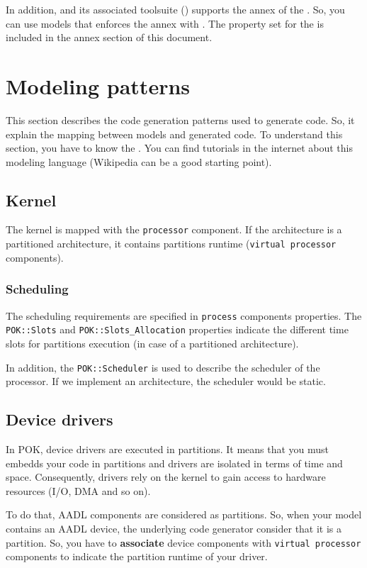    In addition, \pok and its associated \aadl toolsuite (\ocarina) supports the
   \arinc annex of the \aadl. So, you can use models that enforces the \arinc
   annex with \pok. The \arinc property set for the \aadl is included in the
   annex section of this document.

   \section{Modeling patterns}
   This section describes the code generation patterns used to generate code.
   So, it explain the mapping between \aadl models and generated code. To
   understand this section, you have to know the \aadl. You can find tutorials
   in the internet about this modeling language (Wikipedia can be a good
   starting point).

      \subsection{Kernel}
      The kernel is mapped with the \aadl \texttt{processor} component. If the
      architecture is a partitioned architecture, it contains partitions runtime
      (\aadl \texttt{virtual processor} components).

         \subsubsection{Scheduling}
         The scheduling requirements are specified in \texttt{process}
         components properties. The \texttt{POK::Slots} and
         \texttt{POK::Slots\_Allocation} properties indicate the different time
         slots for partitions execution (in case of a partitioned architecture).

         In addition, the \texttt{POK::Scheduler} is used to describe the
         scheduler of the processor. If we implement an \arinc architecture, the
         scheduler would be static.

      \subsection{Device drivers}
         In POK, device drivers are executed in partitions. It means that you
         must embedds your code in partitions and drivers are isolated in terms
         of time and space. Consequently, drivers rely on the kernel to gain
         access to hardware resources (I/O, DMA and so on).

         To do that, AADL components are considered as partitions. So, when your
         model contains an AADL device, the underlying code generator consider
         that it is a partition. So, you have to \textbf{associate} device
         components with \texttt{virtual processor} components to indicate the
         partition runtime of your driver.

